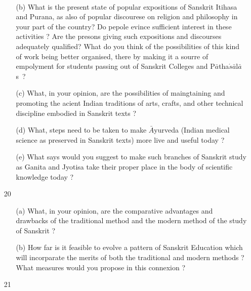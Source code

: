 {\rm 
\begin{itemize} 
\item[~] \begin{itemize}
\item[(b)] What is the present state of popular expositions of Sanskrit Itihasa and Purana, as also of popular discourese on religion and philosophy in your part of the country? Do pepole evince sufficient interest in these activities ? Are the presons giving such expositions and discourses adequately qualified?  What do you think of the possibilities of this kind of work  being better organised, there by making it a sourre of empolyment for students passing out of Sanskrit Colleges and P$\bar{a}$tha$\acute{s}\bar{a}$l$\bar{a}$s~?
             
             \item[(c)] What, in your opinion, are the possibilities of maingtaining and promoting the acient Indian traditions of arts, crafts, and other technical discipline embodied in Sanskrit texts ?
             
            \item[(d)] What, steps need to be taken to make  $\bar{A}$yurveda (Indian medical science as preserved in Sanskrit texts) more live and useful today ?
            
            \item[(e)] What says would you suggest to make such branches of Sanskrit study as Ganita and Jyotisa take their proper place in the body of scientific knowledge today ?
            \end{itemize}
  
 \item[20] \begin{itemize}
             \item[(a)] What, in your opinion, are the comparative advantages and drawbacks of the traditional method and the modern method of the study of Sanskrit ?
             
             \item[(b)] How far is it feasible to evolve a pattern of Sanskrit Education which will incorparate the merits of both the traditional and modern methods ? What measures would you propose in this connexion ?
             
            \end{itemize}                      
  
 \item[21] \begin{itemize}
           

\end{itemize}
\end{itemize}}
